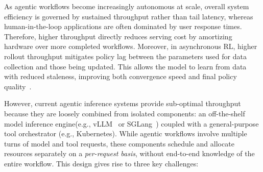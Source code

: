 
As agentic workflows become increasingly autonomous at scale, overall system efficiency is governed by sustained throughput rather than tail latency, whereas human-in-the-loop applications are often dominated by user response times. Therefore, higher throughput directly reduces serving cost by amortizing hardware over more completed workflows. Moreover, in asynchronous RL, higher rollout throughput mitigates policy lag between the parameters used for data collection and those being updated. This allows the model to learn from data with reduced staleness, improving both convergence speed and final policy quality~\citep{fu2025areallargescaleasynchronousreinforcement, Sheng_2025, shenfeld2025rlsrazoronlinereinforcement,zheng2025stabilizingreinforcementlearningllms}.



However, current agentic inference systems provide sub-optimal throughput because they are loosely combined from isolated components: an off-the-shelf model inference engine(e.g., vLLM~\citep{kwon2023efficientmemorymanagementlarge} or SGLang~\citep{zheng2024sglangefficientexecutionstructured}) coupled with a general-purpose tool orchestrator (e.g., Kubernetes). While agentic workflows involve multiple turns of model and tool requests, these components schedule and allocate resources separately on a \textit{per-request basis}, without end-to-end knowledge of the entire workflow. This design gives rise to three key challenges:

